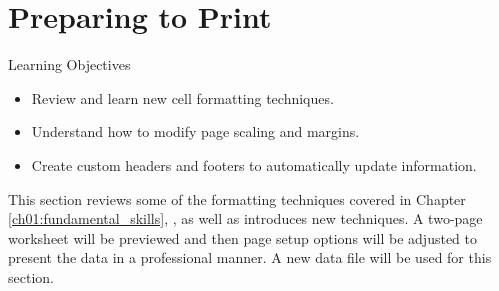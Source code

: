 \section{Preparing to Print}\label{ch02:preparing_to_print}

\begin{center}
	\begin{objbox}{Learning Objectives}
		\begin{itemize}
			\setlength{\itemsep}{0pt}
			\setlength{\parskip}{0pt}
			\setlength{\parsep}{0pt}
			
			\item Review and learn new cell formatting techniques.
			\item Understand how to modify page scaling and margins.
			\item Create custom headers and footers to automatically update information.

		\end{itemize}
	\end{objbox}
\end{center}

This section reviews some of the formatting techniques covered in Chapter \ref{ch01:fundamental_skills}, , as well as introduces new techniques. A two-page worksheet will be previewed and then page setup options will be adjusted to present the data in a professional manner. A new data file will be used for this section.


